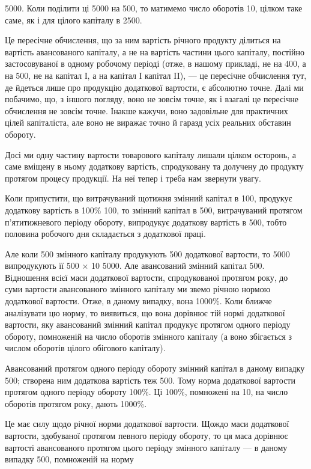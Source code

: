 \parcont{}  %
 \deq{} 5000. Коли поділити ці 5000 на 500, то матимемо число оборотів 10,
цілком таке саме, як і для цілого капіталу в 2500.

Це пересічне обчислення, що за ним вартість річного продукту ділиться на вартість авансованого
капіталу, а не на вартість частини цього капіталу, постійно застосовуваної в одному робочому періоді
(отже, в нашому прикладі, не на 400, а на 500, не на капітал І, а на капітал І \dplus{} капітал II), — це
пересічне обчислення тут, де йдеться лише про продукцію додаткової вартости, є абсолютно точне. Далі
ми побачимо, що, з іншого погляду, воно не зовсім точне, як і взагалі це пересічне обчислення не
зовсім точне. Інакше кажучи, воно задовільне для практичних цілей капіталіста,
але воно не виражає точно й гаразд усіх реальних обставин обороту.

Досі ми одну частину вартости товарового капіталу лишали цілком осторонь, а саме вміщену в ньому
додаткову вартість, спродуковану та долучену до продукту протягом процесу продукції. На неї тепер і
треба нам звернути увагу.

Коли припустити, що витрачуваний щотижня змінний капітал в 100, продукує додаткову
вартість в 100\% \deq{} 100, то змінний капітал в 500,  витрачуваний протягом
п’ятитижневого періоду обороту, випродукує додаткову вартість в 500, тобто половина
робочого дня складається з додаткової праці.

Але коли 500 змінного капіталу продукують 500 додаткової вартости, то 5000 випродукують її 500 × 10 \deq{} 5000. Але авансований змінний капітал \deq{} 500.
Відношення всієї маси додаткової вартости, спродукованої протягом року, до суми вартости
авансованого змінного капіталу ми звемо річною нормою додаткової вартости. Отже, в даному випадку,
вона \deq{}  \deq{} 1000\%.
Коли ближче аналізувати цю норму, то виявиться, що вона дорівнює тій нормі додаткової вартости, яку
авансований змінний капітал продукує протягом одного періоду обороту, помноженій на число оборотів
змінного капіталу (а воно збігається з числом оборотів цілого обігового капіталу).

Авансований протягом одного періоду обороту змінний капітал в даному випадку \deq{} 500;
створена ним додаткова вартість теж \deq{} 500. Тому норма додаткової вартости протягом одного
періоду обороту \deq{}  \deq{} 100\%. Ці 100\%, помножені на 10, на число оборотів протягом року,
дають  \deq{} 1000\%.

Це має силу щодо річної норми додаткової вартости. Щождо маси додаткової вартости, здобуваної
протягом певного періоду обороту, то ця маса дорівнює вартості авансованого протягом цього періоду
змінного капіталу — в даному випадку \deq{} 500, помноженій на норму
\parbreak{}  %
